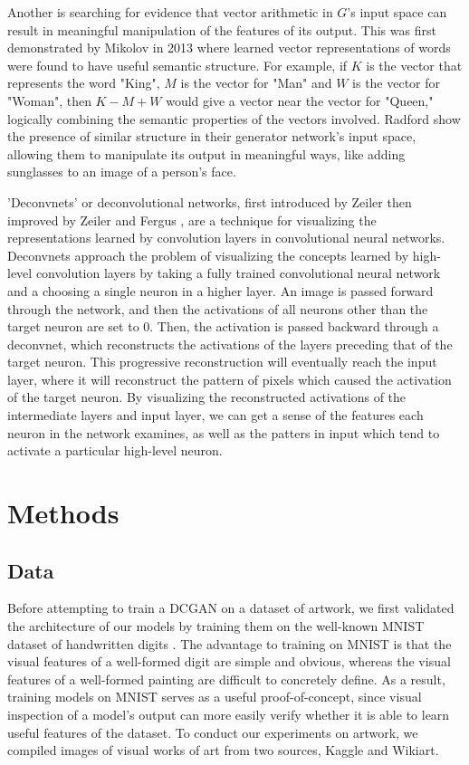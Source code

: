 \documentclass[10pt,twocolumn,letterpaper]{article}
\begin{document}
Another is searching for evidence that vector arithmetic in $ G $'s input space can result in meaningful
manipulation of the features of its output. This was first demonstrated by Mikolov \etal in 2013 \cite{mikolov2013distributed} where learned vector representations of words were found to have useful semantic structure. For example, if $ K $ is the vector that represents the word "King", $ M $ is the vector for "Man" and $ W $ is the vector for "Woman", then $ K - M + W $ would give a vector near the vector for "Queen," logically combining the semantic properties of the vectors involved. Radford \etal \cite{radford2015unsupervised} show the presence of similar structure in their generator network's input space, allowing them to manipulate its output in meaningful ways, like adding sunglasses to an image of a person's face.

'Deconvnets' or deconvolutional networks, first introduced by Zeiler \cite{zeiler2011adaptive} then improved by Zeiler and Fergus \cite{zeiler2014visualizing}, are a technique for visualizing the representations learned by convolution layers in convolutional neural networks. Deconvnets approach the problem of visualizing the concepts learned by high-level convolution layers by taking a fully trained convolutional neural network and a choosing a single neuron in a higher layer. An image is passed forward through the network, and then the activations of all neurons other than the target neuron are set to 0. Then, the activation is passed backward through a deconvnet, which reconstructs the activations of the layers preceding that of the target neuron. This progressive reconstruction will eventually reach the input layer, where it will reconstruct the pattern of pixels which caused the activation of the target neuron. By visualizing the reconstructed activations of the intermediate layers and input layer, we can get a sense of the features each neuron in the network examines, as well as the patters in input which tend to activate a particular high-level neuron.

\section{Methods}
\subsection{Data}
Before attempting to train a DCGAN on a dataset of artwork, we first validated the architecture of our models by training them on the well-known MNIST dataset of handwritten digits \cite{lecun2010mnist}. The advantage to training on MNIST is that the visual features of a well-formed digit are simple and obvious, whereas the visual features of a well-formed painting are difficult to concretely define. As a result, training models on MNIST serves as a useful proof-of-concept, since visual inspection of a model's output can more easily verify whether it is able to learn useful features of the dataset. To conduct our experiments on artwork, we compiled images of visual works of art from two sources, Kaggle and Wikiart.
\end{document}
